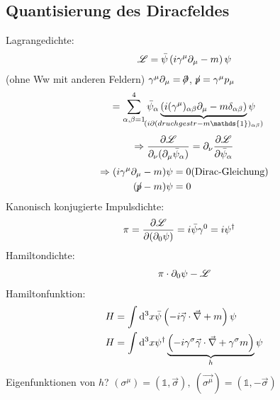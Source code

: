 \subsection{Quantisierung des Diracfeldes} 
	
Lagrangedichte:
	\begin{align*}
		\mathscr{L} = \bar{\psi} \left(
			i \gamma^\mu \partial_\mu - m
		\right) \psi 
	\end{align*}	
(ohne Ww mit anderen Feldern) $\gamma^\mu \partial_\mu = /\!\!\!\!\!\; {\partial}$, $/\!\!\!\!\!\; {p} = \gamma^\mu p_\mu$
	\begin{align*}
		= \sum_{\alpha,\beta = 1}^{4} \bar{\psi}_\alpha 
		\underbrace{\left(
			i (\gamma^\mu)_{\alpha \beta} \partial_\mu - m \delta_{\alpha \beta} 
		\right)}_{\mathclap{(i \partial(druchgestr - m \mathds{1})_{\alpha \beta})}} \psi 
	\end{align*}
	\begin{align*}
		\Rightarrow \frac{\partial \mathscr{L}}{\partial_\nu (\partial_\mu \bar{\psi}_\alpha)}
		= \partial_\nu \frac{\partial \mathscr{L}}{\partial \bar{\psi}_\alpha}
	\end{align*}
	\begin{align*}
		\Rightarrow (i\gamma^\mu \partial_\mu - m) \psi &= 0  \text{(Dirac-Gleichung)} \\
		(/\!\!\!\!\!\; {p} - m) \psi &= 0
	\end{align*}
Kanonisch konjugierte Impulsdichte:
	\begin{align*}
		\pi &= \frac{\partial \mathscr{L}}{\partial(\partial_0 \psi)} = i \bar{\psi} \gamma^0 
		= i \psi^\dagger 
	\end{align*}
Hamiltondichte:
	\begin{align*}
		\pi \cdot \partial_0 \psi - \mathscr{L} 
	\end{align*}
Hamiltonfunktion:
	\begin{align*}
		H &= \int \diff^3 x \bar{\psi} 
		\left(
			- i \vec{\gamma} \cdot \vec{\nabla} + m
		\right) \psi \\
		H &= \int \diff^3 x \psi^\dagger 
		\underbrace{\left(
			- i \gamma^\sigma \vec{\gamma} \cdot \vec{\nabla} + \gamma^\sigma m
		\right)}_{\mathclap{h}} \psi
	\end{align*}
Eigenfunktionen von $h$? $(\sigma^\mu) = (\mathds{1}, \vec{\sigma}),~ (\vec{\sigma^\mu}) = (\mathds{1}, -\vec{\sigma})$
